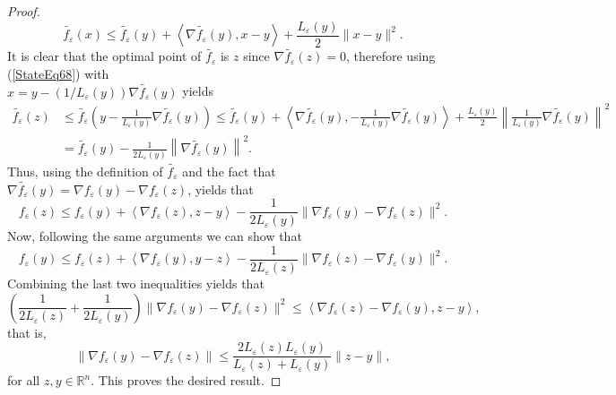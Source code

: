 \documentclass[11pt]{article}
\numberwithin{equation}{section}
\begin{document}
\begin{proof}
\begin{equation}
	\widetilde{f_{\varepsilon}}(x) \leq \widetilde{f_{\varepsilon}}(y) + \left\langle \nabla \widetilde{f_{\varepsilon}}(y), x-y \right\rangle + \frac{L_{\varepsilon}(y)}{2} \|x-y\|^2. \label{StateEq68}
\end{equation}
It is clear that the optimal point of $\widetilde{f_{\varepsilon}}$ is $z$ since $\nabla \widetilde{f_{\varepsilon}}(z) = 0$, therefore using (\ref{StateEq68}) with \\$x = y - \left( 1/L_{\varepsilon}(y) \right) \nabla \widetilde{f_{\varepsilon}}(y)$ yields
\begin{align*}
	\widetilde{f_{\varepsilon}}(z) &\leq \widetilde{f_{\varepsilon}}\left( y - \frac{1}{L_{\varepsilon}(y)} \nabla \widetilde{f_{\varepsilon}}(y) \right) \leq \widetilde{f_{\varepsilon}}(y) + \left\langle \nabla \widetilde{f_{\varepsilon}}(y), - \frac{1}{L_{\varepsilon}(y)} \nabla \widetilde{f_{\varepsilon}}(y) \right\rangle + \frac{L_{\varepsilon}(y)}{2} \left\lVert \frac{1}{L_{\varepsilon}(y)} \nabla \widetilde{f_{\varepsilon}}(y) \right\rVert ^2 \\
	&= \widetilde{f_{\varepsilon}}(y) - \frac{1}{2 L_{\varepsilon}(y)} \left\lVert \nabla \widetilde{f_{\varepsilon}}(y) \right\rVert ^2.
\end{align*}
Thus, using the definition of $\widetilde{f_{\varepsilon}}$ and the fact that $\nabla \widetilde{f_{\varepsilon}}(y) = \nabla f_{\varepsilon}(y) - \nabla f_{\varepsilon}(z)$, yields that
\begin{equation*}
	f_{\varepsilon}(z) \leq f_{\varepsilon}(y) + \left\langle \nabla f_{\varepsilon}(z), z - y \right\rangle - \frac{1}{2 L_{\varepsilon}(y)} \| \nabla f_{\varepsilon}(y) - \nabla f_{\varepsilon}(z) \|^2 .
\end{equation*}
Now, following the same arguments we can show that
\begin{equation*}
	f_{\varepsilon}(y) \leq f_{\varepsilon}(z) + \left\langle \nabla f_{\varepsilon}(y), y - z \right\rangle - \frac{1}{2 L_{\varepsilon}(z)} \| \nabla f_{\varepsilon}(z) - \nabla f_{\varepsilon}(y) \|^2 .
\end{equation*}
Combining the last two inequalities yields that
\begin{equation*}
	\left( \frac{1}{2 L_{\varepsilon}(z)} + \frac{1}{2 L_{\varepsilon}(y)} \right) \| \nabla f_{\varepsilon}(y) - \nabla f_{\varepsilon}(z) \|^2 \leq \left\langle \nabla f_{\varepsilon}(z) - \nabla f_{\varepsilon}(y), z - y \right\rangle ,
\end{equation*}
that is, 
\begin{equation*}
	\| \nabla f_{\varepsilon}(y) - \nabla f_{\varepsilon}(z) \| \leq \frac{2L_{\varepsilon}(z)L_{\varepsilon}(y)}{L_{\varepsilon}(z) + L_{\varepsilon}(y)} \|z - y\| ,
\end{equation*}
for all $z,y \in \mathbb{R}^n$. This proves the desired result.
\end{proof}
\end{document}
